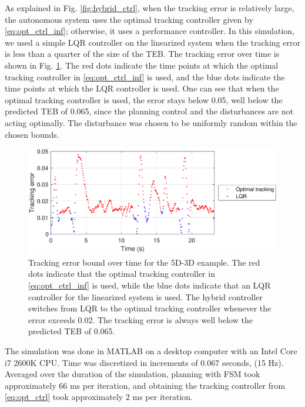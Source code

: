 As explained in Fig. \ref{fig:hybrid_ctrl}, when the tracking error is relatively large, the autonomous system uses the optimal tracking controller given by \eqref{eq:opt_ctrl_inf}; otherwise, it uses a performance controller. 
In this simulation, we used a simple LQR controller on the linearized system when the tracking error is less than a quarter of the size of the TEB.
The tracking error over time is shown in Fig. \ref{fig:P5D_Dubins_tracking_error}.
The red dots indicate the time points at which the optimal tracking controller in \eqref{eq:opt_ctrl_inf} is used, and the blue dots indicate the time points at which the LQR controller is used. 
One can see that when the optimal tracking controller is used, the error stays below 0.05, well below the predicted TEB of 0.065, since the planning control and the disturbances are not acting optimally.
The disturbance was chosen to be uniformly random within the chosen bounds.

\begin{figure}
  \includegraphics[width=\columnwidth]{fig/P5D_Dubins/tracking_error}
  \caption{Tracking error bound over time for the 5D-3D example. The red dots indicate that the optimal tracking controller in \eqref{eq:opt_ctrl_inf} is used, while the blue dots indicate that an LQR controller for the linearized system is used. The hybrid controller switches from LQR to the optimal tracking controller whenever the error exceeds 0.02. The tracking error is always well below the predicted TEB of 0.065.}
  \label{fig:P5D_Dubins_tracking_error}
\end{figure}

The simulation was done in MATLAB on a desktop computer with an Intel Core i7 2600K CPU.
Time was discretized in increments of $0.067$ seconds, (15 Hz).
Averaged over the duration of the simulation, planning with FSM took approximately $66$ ms per iteration, and obtaining the tracking controller from \eqref{eq:opt_ctrl} took approximately $2$ ms per iteration.
